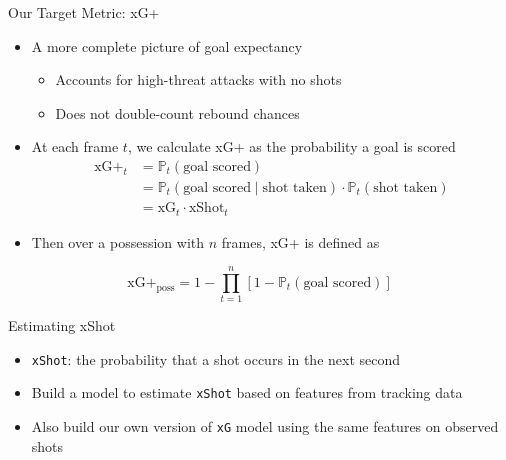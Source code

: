 \documentclass[
  11pt,
  ignorenonframetext,
]{beamer}
\providecommand{\tightlist}{%
  \setlength{\itemsep}{0pt}\setlength{\parskip}{0pt}}
\begin{document}
\begin{frame}{Our Target Metric: xG+}
\protect{}\label{our-target-metric-xg}
\begin{itemize}
\tightlist
\item
  A more complete picture of goal expectancy

  \begin{itemize}
  \tightlist
  \item
    Accounts for high-threat attacks with no shots
  \item
    Does not double-count rebound chances
  \end{itemize}
\item
  At each frame \(t\), we calculate xG+ as the probability a goal is
  scored \[
  \begin{aligned}
  \text{xG+}_t &= \mathbb{P}_t(\text{goal scored}) \\
  &= \mathbb{P}_t(\text{goal scored} \mid \text{shot taken})\cdot\mathbb{P}_t(\text{shot taken}) \\
  &= \text{xG}_t\cdot\text{xShot}_t
  \end{aligned}
  \]
\item
  Then over a possession with \(n\) frames, xG+ is defined as
\end{itemize}

\[\text{xG+}_\text{poss} = 1 - \prod_{t = 1}^n \left[1 - \mathbb{P}_t\left(\text{goal scored}\right)\right]\]
\end{frame}

\begin{frame}[fragile]{Estimating xShot}
\protect{}\label{estimating-xshot}
\begin{itemize}
\tightlist
\item
  \texttt{xShot}: the probability that a shot occurs in the next second
\item
  Build a model to estimate \texttt{xShot} based on features from
  tracking data
\item
  Also build our own version of \texttt{xG} model using the same
  features on observed shots
\end{itemize}
\end{frame}
\end{document}
